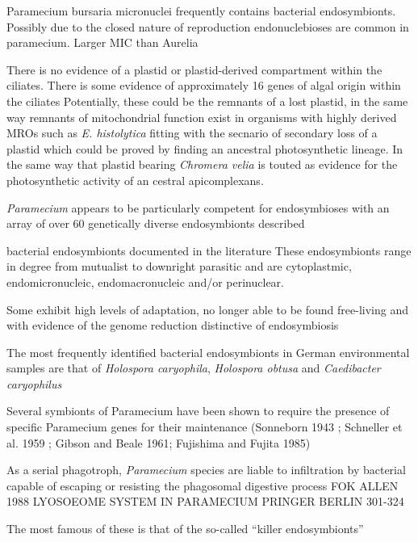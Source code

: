 Paramecium bursaria micronuclei frequently contains bacterial endosymbionts.  Possibly due to the closed
nature of reproduction endonuclebioses are common in paramecium.  Larger MIC than Aurelia \citep{Gortz2009}



There is no evidence of a plastid or plastid-derived compartment within the ciliates.
There is some evidence of approximately 16 genes of algal origin within the ciliates 
Potentially, these could be the remnants of a lost plastid, in the same way remnants of mitochondrial function 
exist in organisms with highly derived MROs such as \textit{E. histolytica} fitting with the secnario of
secondary loss of a plastid which could be proved by finding an ancestral photosynthetic lineage.
In the same way that plastid bearing \textit{Chromera velia} is touted as evidence for the photosynthetic activity
of an cestral apicomplexans. \citep{Reyes-Prieto2008}



\textit{Paramecium} appears to be particularly competent for endosymbioses with an array of over 60 
genetically diverse endosymbionts described \citep{Gortz2009}

bacterial endosymbionts documented in the literature \citep{Gortz2009}
These endosymbionts range in degree from mutualist to downright parasitic and are cytoplastmic, endomicronucleic,
endomacronucleic and/or perinuclear. 

Some exhibit high levels of adaptation, no longer able to be found free-living and with evidence of the genome reduction
distinctive of endosymbiosis \citep{Gortz2009} %

The most frequently identified bacterial endosymbionts in German environmental samples are that of \textit{Holospora  caryophila},
\textit{Holospora obtusa} and \textit{Caedibacter caryophilus}


Several symbionts of Paramecium have been shown to require the presence of specific Paramecium genes for their maintenance (Sonneborn 1943 ; Schneller et al. 1959 ; Gibson and Beale 1961; Fujishima and Fujita 1985)


As a serial phagotroph, \textit{Paramecium} species are liable to infiltration by bacterial capable of escaping or resisting
the phagosomal digestive process FOK ALLEN 1988 LYOSOEOME SYSTEM IN PARAMECIUM PRINGER BERLIN 301-324





The most famous of these is that of the so-called ``killer endosymbionts'' 


